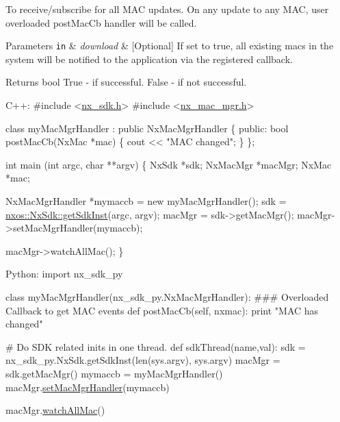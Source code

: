 To receive/subscribe for all M\+AC updates. On any update to any M\+AC, user overloaded post\+Mac\+Cb handler will be called.


\begin{DoxyParams}[1]{Parameters}
\mbox{\tt in}  & {\em download} & \mbox{[}Optional\mbox{]} If set to true, all existing macs in the system will be notified to the application via the registered callback.\\
\hline
\end{DoxyParams}
\begin{DoxyReturn}{Returns}
bool True -\/ if successful. False -\/ if not successful. 
\begin{DoxyCode}
C++:
\textcolor{preprocessor}{     #include <\mbox{\hyperlink{nx__sdk_8h}{nx\_sdk.h}}>}
\textcolor{preprocessor}{     #include <\mbox{\hyperlink{nx__mac__mgr_8h}{nx\_mac\_mgr.h}}>}

     \textcolor{keyword}{class }myMacMgrHandler : \textcolor{keyword}{public} NxMacMgrHandler \{
        \textcolor{keyword}{public}:
           \textcolor{keywordtype}{bool} postMacCb(NxMac *mac) \{
                cout << \textcolor{stringliteral}{"MAC changed"};
           \}
     \};

     \textcolor{keywordtype}{int}  main (\textcolor{keywordtype}{int} argc, \textcolor{keywordtype}{char} **argv)
     \{
          NxSdk    *sdk;
          NxMacMgr *macMgr;
          NxMac    *mac;

          NxMacMgrHandler *mymaccb = \textcolor{keyword}{new} myMacMgrHandler();
          sdk = \mbox{\hyperlink{classnxos_1_1_nx_sdk_a5050e2d26c40744b4fc7862068a83f39}{nxos::NxSdk::getSdkInst}}(argc, argv);
          macMgr = sdk->getMacMgr();
          macMgr->setMacMgrHandler(mymaccb);

          macMgr->watchAllMac();
     \}

Python:
   \textcolor{keyword}{import} nx\_sdk\_py

   \textcolor{keyword}{class }myMacMgrHandler(nx\_sdk\_py.NxMacMgrHandler):
\textcolor{preprocessor}{   ### Overloaded Callback to get MAC events}
         def postMacCb(self, nxmac):
             print "MAC has changed"

\textcolor{preprocessor}{   # Do SDK related inits in one thread.}
   def sdkThread(name,val):
       sdk = nx\_sdk\_py.NxSdk.getSdkInst(len(sys.argv), sys.argv)
       macMgr = sdk.getMacMgr()
       mymaccb = myMacMgrHandler()
       macMgr.\mbox{\hyperlink{classnxos_1_1_nx_mac_mgr_a06f53bd41ddb17e6cfaef5a02b00415d}{setMacMgrHandler}}(mymaccb)

       macMgr.\mbox{\hyperlink{classnxos_1_1_nx_mac_mgr_a5f4d2d56e21e3ae39969fa67774779d8}{watchAllMac}}()
\end{DoxyCode}
 
\end{DoxyReturn}
\mbox{\label{classnxos_1_1_nx_mac_mgr_a12dde38c22d9a27e1e3bde318d418134}} 
